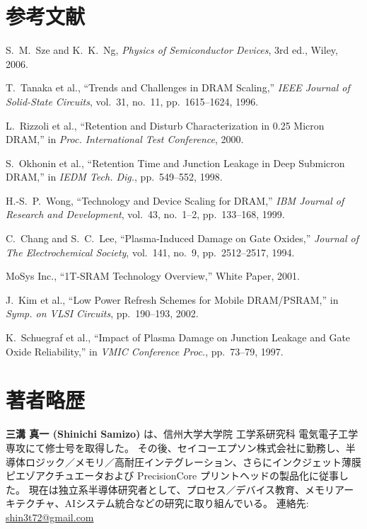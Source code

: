 \documentclass[conference]{IEEEtran}
\begin{document}
\section*{参考文献}
\begin{thebibliography}{00}
S.~M.~Sze and K.~K.~Ng, \emph{Physics of Semiconductor Devices}, 3rd ed., Wiley, 2006.

T.~Tanaka et al., ``Trends and Challenges in DRAM Scaling,'' \emph{IEEE Journal of Solid-State Circuits}, vol.~31, no.~11, pp.~1615--1624, 1996.

L.~Rizzoli et al., ``Retention and Disturb Characterization in 0.25 Micron DRAM,'' in \emph{Proc. International Test Conference}, 2000.

S.~Okhonin et al., ``Retention Time and Junction Leakage in Deep Submicron DRAM,'' in \emph{IEDM Tech. Dig.}, pp.~549--552, 1998.

H.-S.~P.~Wong, ``Technology and Device Scaling for DRAM,'' \emph{IBM Journal of Research and Development}, vol.~43, no.~1–2, pp.~133--168, 1999.

C.~Chang and S.~C.~Lee, ``Plasma-Induced Damage on Gate Oxides,'' \emph{Journal of The Electrochemical Society}, vol.~141, no.~9, pp.~2512--2517, 1994.

MoSys Inc., ``1T-SRAM Technology Overview,'' White Paper, 2001.

J.~Kim et al., ``Low Power Refresh Schemes for Mobile DRAM/PSRAM,'' in \emph{Symp. on VLSI Circuits}, pp.~190--193, 2002.

K.~Schuegraf et al., ``Impact of Plasma Damage on Junction Leakage and Gate Oxide Reliability,'' in \emph{VMIC Conference Proc.}, pp.~73--79, 1997.

\end{thebibliography}

\section*{著者略歴}
\noindent\textbf{三溝 真一 (Shinichi Samizo)} は、信州大学大学院 工学系研究科 電気電子工学専攻にて修士号を取得した。
その後、セイコーエプソン株式会社に勤務し、半導体ロジック／メモリ／高耐圧インテグレーション、さらにインクジェット薄膜ピエゾアクチュエータおよび PrecisionCore プリントヘッドの製品化に従事した。
現在は独立系半導体研究者として、プロセス／デバイス教育、メモリアーキテクチャ、AIシステム統合などの研究に取り組んでいる。
連絡先: \href{mailto:shin3t72@gmail.com}{shin3t72@gmail.com}
\end{document}
